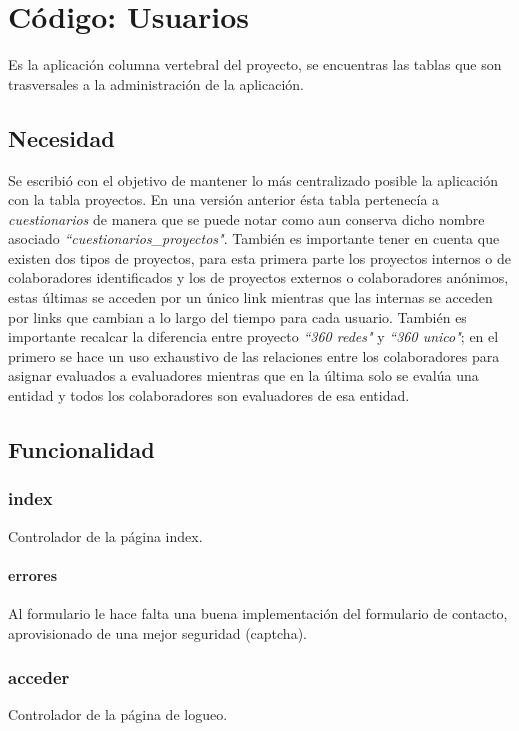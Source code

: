 \documentclass[10pt,a4paper]{book}
\begin{document}
	\chapter{Código: Usuarios}
		
	Es la aplicación columna vertebral del proyecto, se encuentras las tablas que son trasversales a la administración de la aplicación.

	\section{Necesidad}
	
	Se escribió con el objetivo de mantener lo más centralizado posible la aplicación con la tabla proyectos. En una versión anterior ésta tabla pertenecía a \textit{cuestionarios} de manera que se puede notar como aun conserva dicho nombre asociado \textit{``cuestionarios\_proyectos"}. También es importante tener en cuenta que existen dos tipos de proyectos, para esta primera parte los proyectos internos o de colaboradores identificados y los de proyectos externos o colaboradores anónimos, estas últimas se acceden por un único link mientras que las internas se acceden por links que cambian a lo largo del tiempo para cada usuario. También es importante recalcar la diferencia entre proyecto \textit{``360 redes"} y \textit{``360 unico"}; en el primero se hace un uso exhaustivo de las relaciones entre los colaboradores para asignar evaluados a evaluadores mientras que en la última solo se evalúa una entidad y todos los colaboradores son evaluadores de esa entidad.
	
	\section{Funcionalidad}
	
	\subsection{index}
	Controlador de la página index.
		
	\subsubsection{errores} Al formulario le hace falta una buena implementación del formulario de contacto, aprovisionado de una mejor seguridad (captcha).
	
	
	\subsection{acceder} 
	Controlador de la página de logueo.
	
\end{document}
